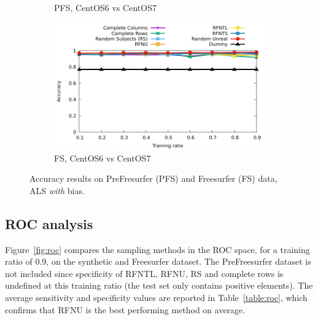 \documentclass[10pt, conference, compsocconf]{IEEEtran}
\begin{document}
\begin{figure}
\begin{subfigure}[b]{\columnwidth}
        \caption{PFS, CentOS6 vs CentOS7}
\end{subfigure}\hfill
\begin{subfigure}[b]{\columnwidth}
        \includegraphics[width=0.8\columnwidth]{data/results/means_of_results/ALS-Bias/FS-100files/ALS-Bias-FS100files.pdf}
        \caption{FS, CentOS6 vs CentOS7}
\end{subfigure}
\caption{Accuracy results on PreFresurfer (PFS) and Freesurfer (FS) data, ALS \emph{with} bias.}
\label{fig:results-real-als-bias}
\end{figure}

\subsection{ROC analysis}

Figure~\ref{fig:roc} compares the sampling methods in the ROC space, 
for a training ratio of 0.9, on the synthetic and Freesurfer dataset. 
The PreFreesurfer dataset is not included since specificity of RFNTL, 
RFNU, RS and complete rows is undefined at this training ratio (the 
test set only contains positive elements). The average sensitivity and specificity values 
are reported in Table~\ref{table:roc}, which confirms that RFNU is the best 
performing method on average.
\end{document}
